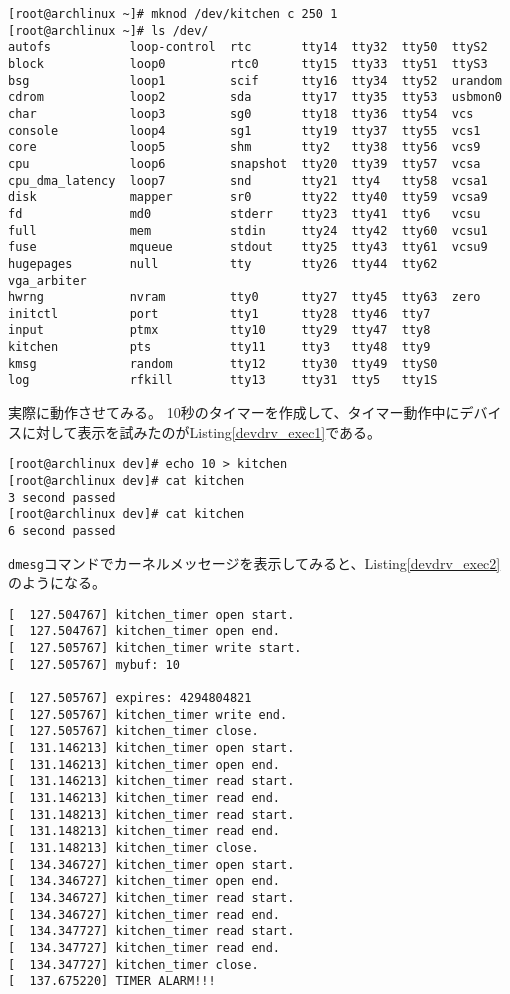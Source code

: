\documentclass[main]{subfiles}
\begin{document}
\begin{lstlisting}[label=device_register,caption=\texttt{/dev}以下にファイルを作成]
[root@archlinux ~]# mknod /dev/kitchen c 250 1
[root@archlinux ~]# ls /dev/
autofs           loop-control  rtc       tty14  tty32  tty50  ttyS2
block            loop0         rtc0      tty15  tty33  tty51  ttyS3
bsg              loop1         scif      tty16  tty34  tty52  urandom
cdrom            loop2         sda       tty17  tty35  tty53  usbmon0
char             loop3         sg0       tty18  tty36  tty54  vcs
console          loop4         sg1       tty19  tty37  tty55  vcs1
core             loop5         shm       tty2   tty38  tty56  vcs9
cpu              loop6         snapshot  tty20  tty39  tty57  vcsa
cpu_dma_latency  loop7         snd       tty21  tty4   tty58  vcsa1
disk             mapper        sr0       tty22  tty40  tty59  vcsa9
fd               md0           stderr    tty23  tty41  tty6   vcsu
full             mem           stdin     tty24  tty42  tty60  vcsu1
fuse             mqueue        stdout    tty25  tty43  tty61  vcsu9
hugepages        null          tty       tty26  tty44  tty62  vga_arbiter
hwrng            nvram         tty0      tty27  tty45  tty63  zero
initctl          port          tty1      tty28  tty46  tty7
input            ptmx          tty10     tty29  tty47  tty8
kitchen          pts           tty11     tty3   tty48  tty9
kmsg             random        tty12     tty30  tty49  ttyS0
log              rfkill        tty13     tty31  tty5   tty1S
\end{lstlisting}

実際に動作させてみる。
10秒のタイマーを作成して、タイマー動作中にデバイスに対して表示を試みたのがListing\ref{devdrv_exec1}である。

\begin{lstlisting}[label=devdrv_exec1,caption=シェル上での動作]
[root@archlinux dev]# echo 10 > kitchen
[root@archlinux dev]# cat kitchen
3 second passed
[root@archlinux dev]# cat kitchen
6 second passed
\end{lstlisting}

\texttt{dmesg}コマンドでカーネルメッセージを表示してみると、Listing\ref{devdrv_exec2}のようになる。

\begin{lstlisting}[label=devdrv_exec2,caption=\texttt{dmesg}でカーネルメッセージを読む]
[  127.504767] kitchen_timer open start.
[  127.504767] kitchen_timer open end.
[  127.505767] kitchen_timer write start.
[  127.505767] mybuf: 10

[  127.505767] expires: 4294804821
[  127.505767] kitchen_timer write end.
[  127.505767] kitchen_timer close.
[  131.146213] kitchen_timer open start.
[  131.146213] kitchen_timer open end.
[  131.146213] kitchen_timer read start.
[  131.146213] kitchen_timer read end.
[  131.148213] kitchen_timer read start.
[  131.148213] kitchen_timer read end.
[  131.148213] kitchen_timer close.
[  134.346727] kitchen_timer open start.
[  134.346727] kitchen_timer open end.
[  134.346727] kitchen_timer read start.
[  134.346727] kitchen_timer read end.
[  134.347727] kitchen_timer read start.
[  134.347727] kitchen_timer read end.
[  134.347727] kitchen_timer close.
[  137.675220] TIMER ALARM!!!
\end{lstlisting}
\end{document}
